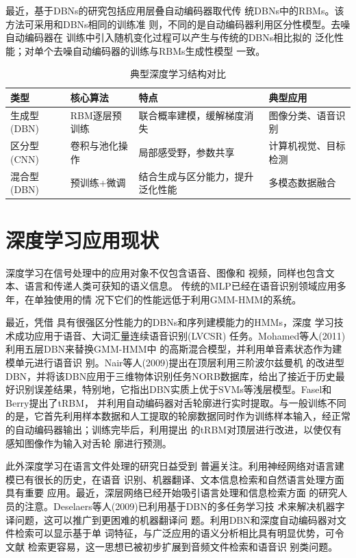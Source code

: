 \documentclass[UTF8]{article}
\begin{document}
	最近，基于DBNs的研究包括应用层叠自动编码器取代传
	统DBNs中的RBMs。该方法可采用和DBNs相同的训练准
	则，不同的是自动编码器利用区分性模型。去噪自动编码器在
	训练中引入随机变化过程可以产生与传统的DBNs相比拟的
	泛化性能；对单个去噪自动编码器的训练与RBMs生成性模型
	一致。

   	\begin{table}[H]
	\centering
	\label{tab:dl_arch}
	\caption{典型深度学习结构对比}
	\begin{tabular}{p{3cm}p{3cm}p{4cm}p{3cm}}
		\toprule
		\textbf{类型}       & \textbf{核心算法}       & \textbf{特点}                          & \textbf{典型应用}         \\ 
		\midrule
		生成型(DBN)     & RBM逐层预训练         & 联合概率建模，缓解梯度消失           & 图像分类、语音识别       \\
		区分型(CNN)     & 卷积与池化操作         & 局部感受野，参数共享                 & 计算机视觉、目标检测     \\
		混合型(DBN)  & 预训练+微调            & 结合生成与区分能力，提升泛化性能     & 多模态数据融合           \\
		\bottomrule
	\end{tabular}
    \end{table}
	
	\section{深度学习应用现状}
	深度学习在信号处理中的应用对象不仅包含语音、图像和
	视频，同样也包含文本、语言和传递人类可获知的语义信息。
	传统的MLP已经在语音识别领域应用多年，在单独使用的情
	况下它们的性能远低于利用GMM-HMM的系统。
	
	最近，凭借
	具有很强区分性能力的DBNs和序列建模能力的HMMs，深度
	学习技术成功应用于语音、大词汇量连续语音识别(LVCSR)\cite{v24}
	任务。Mohamed等人(2011)\cite{v25}利用五层DBN来替换GMM-HMM中
	的高斯混合模型，并利用单音素状态作为建模单元进行语音识
	别。Nair等人(2009)\cite{v26}提出在顶层利用三阶波尔兹曼机
	的改进型DBN，并将该DBN应用于三维物体识别任务NORB数据库，给出了接近于历史最好识别误差结果，特别地，它指出DBN实质上优于SVMs等浅层模型。Fasel和Berry\cite{v27}提出了tRBM，
	并利用自动编码器对舌轮廓进行实时提取。与一般训练不同
	的是，它首先利用样本数据和人工提取的轮廓数据同时作为训练样本输入，经正常的自动编码器输出；训练完毕后，利用提出
	的tRBM对顶层进行改进，以使仅有感知图像作为输入对舌轮
	廓进行预测。
	
	此外深度学习在语言文件处理的研究日益受到
	普遍关注。利用神经网络对语言建模已有很长的历史，在语音
	识别、机器翻译、文本信息检索和自然语言处理方面具有重要
	应用。最近，深层网络已经开始吸引语言处理和信息检索方面
	的研究人员的注意。Deselaers等人(2009)\cite{v28}已利用基于DBN的多任务学习技
	术来解决机器字译问题，这可以推广到更困难的机器翻译问
	题。利用DBN和深度自动编码器对文件检索可以显示基于单
	词特征，与广泛应用的语义分析相比具有明显优势，可令文献
	检索更容易，这一思想已被初步扩展到音频文件检索和语音识
	别类问题\cite{v29}。
	
\end{document}
